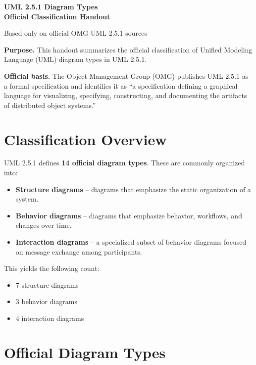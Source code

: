 \documentclass[11pt]{article}
\newcommand{\docTitle}{UML 2.5.1 Diagram Types\\Official Classification Handout}
\begin{document}
{\LARGE\bfseries \docTitle \par}
\vspace{0.5em}
{\large Based only on official OMG UML 2.5.1 sources\par}
\vspace{1em}

\textbf{Purpose.} This handout summarizes the official classification of Unified Modeling Language (UML) diagram types in UML 2.5.1.

\textbf{Official basis.} The Object Management Group (OMG) publishes UML 2.5.1 as a formal specification and identifies it as ``a specification defining a graphical language for visualizing, specifying, constructing, and documenting the artifacts of distributed object systems.''\cite{omg-about,omg-spec}

\section*{Classification Overview}
UML 2.5.1 defines \textbf{14 official diagram types}. These are commonly organized into:
\begin{itemize}[leftmargin=1.5em]
  \item \textbf{Structure diagrams} -- diagrams that emphasize the static organization of a system.
  \item \textbf{Behavior diagrams} -- diagrams that emphasize behavior, workflows, and changes over time.
  \item \textbf{Interaction diagrams} -- a specialized subset of behavior diagrams focused on message exchange among participants.
\end{itemize}

This yields the following count:
\begin{itemize}[leftmargin=1.5em]
  \item 7 structure diagrams
  \item 3 behavior diagrams
  \item 4 interaction diagrams
\end{itemize}

\section*{Official Diagram Types}
\end{document}
